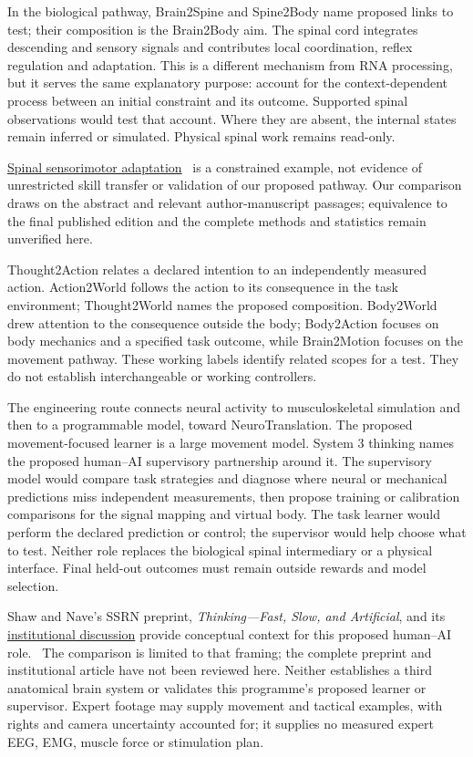 In the biological pathway, Brain2Spine and Spine2Body name proposed links to
test; their composition is the Brain2Body aim. The spinal cord integrates
descending and sensory signals and contributes local coordination, reflex
regulation and adaptation. This is a different mechanism from RNA processing,
but it serves the same explanatory purpose: account for the context-dependent
process between an initial constraint and its outcome. Supported spinal
observations would test that account. Where they are absent, the internal
states remain inferred or simulated. Physical spinal work remains read-only.
\par\noindent \href{https://pubmed.ncbi.nlm.nih.gov/38603479/}{Spinal sensorimotor adaptation}~\cite{lavaud2024}
is a constrained example, not evidence of unrestricted skill transfer or
validation of our proposed pathway. Our comparison draws on the abstract and
relevant author-manuscript passages; equivalence to the final published edition
and the complete methods and statistics remain unverified here.

Thought2Action relates a declared intention to an independently measured action.
Action2World follows the action to its consequence in the task environment;
Thought2World names the proposed composition. Body2World drew attention to the
consequence outside the body; Body2Action focuses on body mechanics and a
specified task outcome, while Brain2Motion focuses on the movement pathway.
These working labels identify related scopes for a test. They do not establish
interchangeable or working controllers.

The engineering route connects neural activity to musculoskeletal simulation
and then to a programmable model, toward NeuroTranslation. The proposed
movement-focused learner is a large movement model. System 3 thinking names
the proposed human--AI supervisory partnership around it. The supervisory
model would compare task strategies and diagnose where neural or mechanical
predictions miss independent measurements, then propose training or calibration
comparisons for the signal mapping and virtual body. The task learner would
perform the declared prediction or control; the supervisor would help choose
what to test. Neither role replaces the biological spinal intermediary or a
physical interface. Final held-out outcomes must remain outside rewards and
model selection.
\par\noindent Shaw and Nave's SSRN preprint,
\emph{Thinking---Fast, Slow, and Artificial}, and its
\href{https://executiveeducation.wharton.upenn.edu/thought-leadership/wharton-at-work/2026/05/thinking-fast-slow-and-artificially/}{institutional discussion}
provide conceptual context for this proposed human--AI role.~\cite{shawNaveSystem3Retained}
The comparison is limited to that framing; the complete preprint and institutional
article have not been reviewed here. Neither establishes a third anatomical brain
system or validates this programme's proposed learner or supervisor. Expert footage may supply
movement and tactical examples, with rights and camera uncertainty accounted
for; it supplies no measured expert EEG, EMG, muscle force or stimulation plan.

